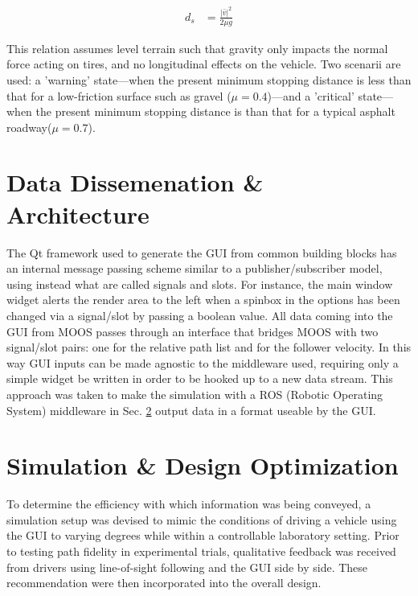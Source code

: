 \documentclass[12pt]{report}
\begin{document}
\begin{align} \label{eq:stopdist}
    d_s &= \frac {|\bar{v}|^2} {2 \mu g}
\end{align}

This relation assumes level terrain such that gravity only impacts the normal force acting on tires, and no longitudinal effects on the vehicle. Two scenarii are used: a 'warning' state---when the present minimum stopping distance is less than that for a low-friction surface such as gravel ($\mu=0.4$)---and a 'critical' state---when the present minimum stopping distance is than that for a typical asphalt roadway($\mu=0.7$). 

\section{Data Dissemenation \& Architecture}
\label{sec:datadiss}

The Qt framework used to generate the GUI from common building blocks has an internal message passing scheme similar to a publisher/subscriber model, using instead what are called signals and slots. For instance, the main window widget alerts the render area to the left when a spinbox in the options has been changed via a signal/slot by passing a boolean value. All data coming into the GUI from MOOS passes through an interface that bridges MOOS with two signal/slot pairs: one for the relative path list and for the follower velocity. In this way GUI inputs can be made agnostic to the middleware used, requiring only a simple widget be written in order to be hooked up to a new data stream. This approach was taken to make the simulation with a ROS (Robotic Operating System) middleware in Sec. \ref{sec:simopt} output data in a format useable by the GUI.



\section{Simulation \& Design Optimization}
\label{sec:simopt}

To determine the efficiency with which information was being conveyed, a simulation setup was devised to mimic the conditions of driving a vehicle using the GUI to varying degrees while within a controllable laboratory setting. Prior to testing path fidelity in experimental trials, qualitative feedback was received from drivers using line-of-sight following and the GUI side by side. These recommendation were then incorporated into the overall design.
\end{document}
